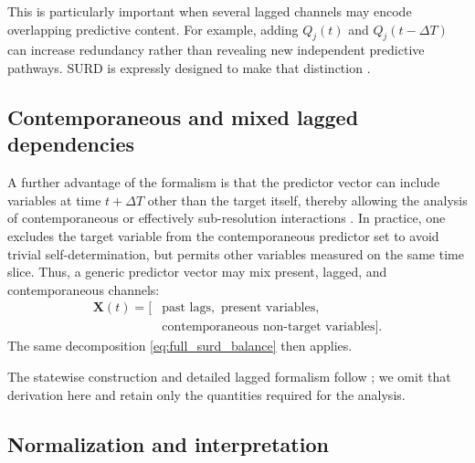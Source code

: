 \documentclass[fleqn,usenatbib]{mnras}
\begin{document}
This is particularly important when several lagged channels may encode overlapping predictive content. For example, adding \(Q_j(t)\) and \(Q_j(t-\Delta T)\) can increase redundancy rather than revealing new independent predictive pathways. SURD is expressly designed to make that distinction \citep{MartinezSanchez2024SURD}.

\subsection{Contemporaneous and mixed lagged dependencies}

A further advantage of the formalism is that the predictor vector can include variables at time \(t+\Delta T\) other than the target itself, thereby allowing the analysis of contemporaneous or effectively sub-resolution interactions \citep{MartinezSanchez2024SURD}. In practice, one excludes the target variable from the contemporaneous predictor set to avoid trivial self-determination, but permits other variables measured on the same time slice. Thus, a generic predictor vector may mix present, lagged, and contemporaneous channels:
\begin{equation}
\begin{split}
\mathbf{X}(t) = \bigl[ & \text{past lags}, \text{ present variables}, \\
                       & \text{contemporaneous non-target variables} \bigr].
\end{split}
\end{equation}
The same decomposition \eqref{eq:full_surd_balance} then applies.

\fi
The statewise construction and detailed lagged formalism follow \citet{MartinezSanchez2024SURD}; we omit that derivation here and retain only the quantities required for the analysis.

\subsection{Normalization and interpretation}
\end{document}
